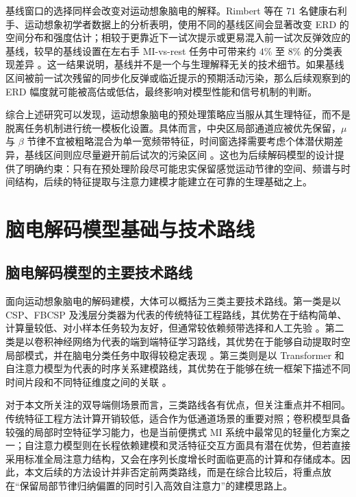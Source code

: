 基线窗口的选择同样会改变对运动想象脑电的解释。Rimbert 等在 $71$ 名健康右利手、运动想象初学者数据上的分析表明，使用不同的基线区间会显著改变 ERD 的空间分布和强度估计；相较于更靠近下一试次提示或更易混入前一试次反弹效应的基线，较早的基线设置在左右手 MI-vs-rest 任务中可带来约 $4\%$ 至 $8\%$ 的分类表现差异 \cite{Rim23b}。这一结果说明，基线并不是一个与生理解释无关的技术细节。如果基线区间被前一试次残留的同步化反弹或临近提示的预期活动污染，那么后续观察到的 ERD 幅度就可能被高估或低估，最终影响对模型性能和信号机制的判断。

综合上述研究可以发现，运动想象脑电的预处理策略应当服从其生理特征，而不是脱离任务机制进行统一模板化设置。具体而言，中央区局部通道应被优先保留，$\mu$ 与 $\beta$ 节律不宜被粗略混合为单一宽频带特征，时间窗选择需要考虑个体潜伏期差异，基线区间则应尽量避开前后试次的污染区间 \cite{Pfu06,Mcf04,Xu19,Rim23b}。这也为后续解码模型的设计提供了明确约束：只有在预处理阶段尽可能忠实保留感觉运动节律的空间、频谱与时间结构，后续的特征提取与注意力建模才能建立在可靠的生理基础之上。

\section{脑电解码模型基础与技术路线}

\subsection{脑电解码模型的主要技术路线}

面向运动想象脑电的解码建模，大体可以概括为三类主要技术路线。第一类是以 CSP、FBCSP 及浅层分类器为代表的传统特征工程路线，其优势在于结构简单、计算量较低、对小样本任务较为友好，但通常较依赖频带选择和人工先验 \cite{ang2012filter, lotte2018review}。第二类是以卷积神经网络为代表的端到端特征学习路线，其优势在于能够自动提取时空局部模式，并在脑电分类任务中取得较稳定表现 \cite{schirrmeister2017deep, lawhern2018eegnet}。第三类则是以 Transformer 和自注意力模型为代表的时序关系建模路线，其优势在于能够在统一框架下描述不同时间片段和不同特征维度之间的关联 \cite{vaswani2017attention, songEEG2022, xie_transformer-based_2022}。

对于本文所关注的双导端侧场景而言，三类路线各有优点，但关注重点并不相同。传统特征工程方法计算开销较低，适合作为低通道场景的重要对照；卷积模型具备较强的局部时空特征学习能力，也是当前便携式 MI 系统中最常见的轻量化方案之一；自注意力模型则在长程依赖建模和灵活特征交互方面具有潜在优势，但若直接采用标准全局注意力结构，又会在序列长度增长时面临更高的计算和存储成本。因此，本文后续的方法设计并非否定前两类路线，而是在综合比较后，将重点放在“保留局部节律归纳偏置的同时引入高效自注意力”的建模思路上。

